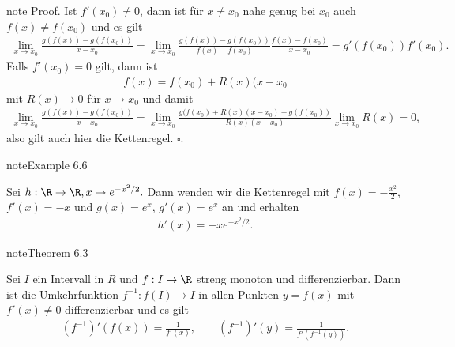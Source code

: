 \documentclass[letterpaper,10pt,english]{jupyterBook}
\begin{document}
\begin{sphinxadmonition}{note}
Proof. Ist \(f'(x_0) \neq 0\), dann ist für \(x\neq x_0\) nahe genug bei \(x_0\) auch \(f(x) \neq f(x_0)\) und es gilt
\begin{equation*}
\begin{split}\lim_{x \rightarrow x_0} \frac{g(f(x))-g(f(x_0))}{x-x_0} = \lim_{x \rightarrow x_0} \frac{g(f(x))-g(f(x_0))}{f(x)-f(x_0)}
 \frac{f(x)-f(x_0)}{x-x_0} = g'(f(x_0)) f'(x_0).\end{split}
\end{equation*}
Falls \(f'(x_0)=0\) gilt, dann ist
\begin{equation*}
\begin{split}f(x) = f(x_0) +  R(x)(x-x_0\end{split}
\end{equation*}
mit \(R(x) \rightarrow  0\) für \(x \rightarrow x_0\) und damit
\begin{equation*}
\begin{split}\lim_{x \rightarrow x_0} \frac{g(f(x))-g(f(x_0))}{x-x_0} =  
\lim_{x \rightarrow x_0} \frac{g(f(x_0)+R(x)(x-x_0)-g(f(x_0))}{R(x)(x-x_0)}  \lim_{x \rightarrow x_0} R(x) = 0,\end{split}
\end{equation*}
also gilt auch hier die Kettenregel. \(\square\).
\end{sphinxadmonition}
\label{differential/kombfkt:example-4}
\begin{sphinxadmonition}{note}{Example 6.6}



Sei \(h: \R \rightarrow \R, x\mapsto e^{-x^2/2}.\) Dann wenden wir die Kettenregel mit \(f(x) = -\frac{x^2}2\), \(f'(x) = -x\) und
\(g(x) = e^x\), \(g'(x)=e^x\) an und erhalten
\begin{equation*}
\begin{split}h'(x) = - x e^{-x^2/2}.\end{split}
\end{equation*}\end{sphinxadmonition}
\label{differential/kombfkt:theorem-5}
\begin{sphinxadmonition}{note}{Theorem 6.3}



Sei \(I\) ein Intervall in \(R\) und \(f: I \rightarrow \R\) streng monoton und differenzierbar. Dann ist die Umkehrfunktion \(f^{-1}: f(I) \rightarrow I\) in allen Punkten \(y=f(x)\) mit \(f'(x) \neq 0\) differenzierbar und es gilt
\begin{equation*}
\begin{split} (f^{-1})'(f(x)) = \frac{1}{f'(x)}, \qquad (f^{-1})'(y) = \frac{1}{f'(f^{-1}(y))}.\end{split}
\end{equation*}\end{sphinxadmonition}
\end{document}
